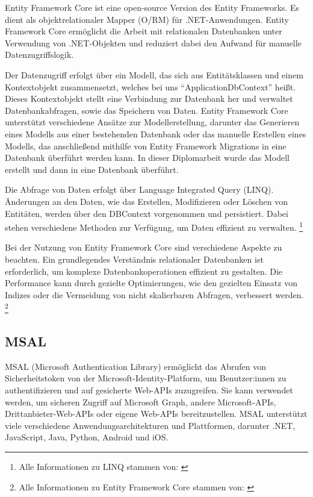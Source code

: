 Entity Framework Core ist eine open-source Version des Entity Frameworks. Es dient 
als objektrelationaler Mapper (O\slash RM) für .NET-Anwendungen. Entity Framework Core ermöglicht 
die Arbeit mit relationalen Datenbanken unter Verwendung von .NET-Objekten und reduziert 
dabei den Aufwand für manuelle Datenzugriffslogik.

Der Datenzugriff erfolgt über ein Modell, das sich aus Entitätsklassen und einem 
Kontextobjekt zusammensetzt, welches bei uns ``ApplicationDbContext'' heißt. Dieses Kontextobjekt 
stellt eine Verbindung zur Datenbank her und verwaltet Datenbankabfragen, sowie das Speichern 
von Daten. Entity Framework Core unterstützt verschiedene Ansätze zur Modellerstellung, 
darunter das Generieren eines Modells aus einer bestehenden Datenbank oder das manuelle 
Erstellen eines Modells, das anschließend mithilfe von Entity Framework Migrations in 
eine Datenbank überführt werden kann. In dieser Diplomarbeit wurde das Modell erstellt und dann
in eine Datenbank überführt.

Die Abfrage von Daten erfolgt über Language Integrated Query (LINQ). Änderungen an den Daten, 
wie das Erstellen, Modifizieren oder Löschen von Entitäten, werden über den DBContext 
vorgenommen und persistiert. Dabei stehen verschiedene Methoden zur Verfügung, 
um Daten effizient zu verwalten.
\footnote{Alle Informationen zu LINQ stammen von: \cite{MicrosoftCorporationq}}

Bei der Nutzung von Entity Framework Core sind verschiedene Aspekte zu beachten. Ein 
grundlegendes Verständnis relationaler Datenbanken ist erforderlich, um komplexe 
Datenbankoperationen effizient zu gestalten. Die Performance kann durch gezielte 
Optimierungen, wie den gezielten Einsatz von Indizes oder die Vermeidung von nicht 
skalierbaren Abfragen, verbessert werden.
\footnote{Alle Informationen zu Entity Framework Core stammen von: \cite{MicrosoftCorporationp}}


\subsection{MSAL}

MSAL (Microsoft Authentication Library) ermöglicht das Abrufen von Sicherheitstoken 
von der Microsoft-Identity-Platform, um Benutzer:innen zu authentifizieren und auf gesicherte Web-APIs 
zuzugreifen. Sie kann verwendet werden, um sicheren Zugriff auf Microsoft Graph, andere 
Microsoft-APIs, Drittanbieter-Web-APIs oder eigene Web-APIs bereitzustellen. MSAL unterstützt 
viele verschiedene Anwendungsarchitekturen und Plattformen, darunter .NET, JavaScript, Java, 
Python, Android und iOS.

